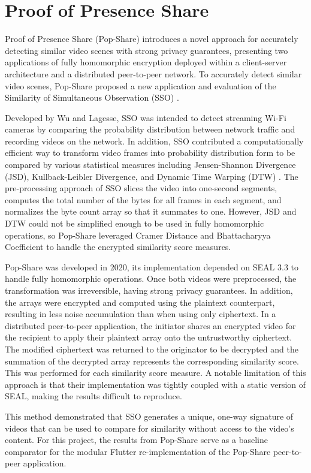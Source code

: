 \section{Proof of Presence Share}

Proof of Presence Share (Pop-Share) \cite{Lagesse2021-PopShare} introduces a novel approach for accurately detecting similar video scenes with strong privacy guarantees, presenting two applications of fully homomorphic encryption deployed within a client-server architecture and a distributed peer-to-peer network. To accurately detect similar video scenes, Pop-Share proposed a new application and evaluation of the Similarity of Simultaneous Observation (SSO) \cite{Wu2019-SSO}. 

Developed by Wu and Lagesse, SSO was intended to detect streaming Wi-Fi cameras by comparing the probability distribution between network traffic and recording videos on the network. In addition, SSO contributed a computationally efficient way to transform video frames into probability distribution form to be compared by various statistical measures including Jensen-Shannon Divergence (JSD), Kullback-Leibler Divergence, and Dynamic Time Warping (DTW) \cite{Sakoe1978-dtw}. The pre-processing approach of SSO slices the video into one-second segments, computes the total number of the bytes for all frames in each segment, and normalizes the byte count array so that it summates to one. However, JSD and DTW could not be simplified enough to be used in fully homomorphic operations, so Pop-Share leveraged Cramer Distance and Bhattacharyya Coefficient to handle the encrypted similarity score measures.

Pop-Share was developed in 2020, its implementation depended on SEAL 3.3 to handle fully homomorphic operations. Once both videos were preprocessed, the transformation was irreversible, having strong privacy guarantees. In addition, the arrays were encrypted and computed using the plaintext counterpart, resulting in less noise accumulation than when using only ciphertext. In a distributed peer-to-peer application, the initiator shares an encrypted video for the recipient to apply their plaintext array onto the untrustworthy ciphertext. The modified ciphertext was returned to the originator to be decrypted and the summation of the decrypted array represents the corresponding similarity score. This was performed for each similarity score measure. A notable limitation of this approach is that their implementation was tightly coupled with a static version of SEAL, making the results difficult to reproduce.

This method demonstrated that SSO generates a unique, one-way signature of videos that can be used to compare for similarity without access to the video's content. For this project, the results from Pop-Share serve as a baseline comparator for the modular Flutter re-implementation of the Pop-Share peer-to-peer application.
